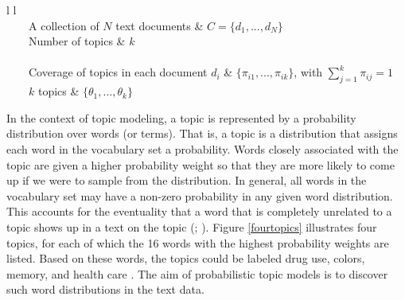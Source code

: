 \documentclass[11pt,a4paper,english,oneside]{book}
\newcommand{\tabitem}{~~\llap{\textbullet}~~}
\numberwithin{equation}{chapter}
\begin{document}
\begin{table}[h] %
	\centering %
	\begin{tabular}{ l  l  } %
		\toprule %
		 \\
		\midrule %
		\tabitem A collection of $N$  text documents & $C=\{d_1,...,d_N\}$ \\
		\tabitem Number of topics & $k$ \\
		\midrule
		 \\
		\midrule
		\tabitem Coverage of topics in each document $d_i$ & $\{\pi_{i1}, ..., \pi_{ik}\}$, with $\sum_{j=1}^{k} \pi_{ij} = 1$\\
		\tabitem $k$ topics & $\{\theta_1, ..., \theta_k\}$\\ %
		\bottomrule %
	\end{tabular}
	\caption{Formal definition of topic modeling task.} %
	\label{tab:task} %
\end{table}

In the context of topic modeling, a topic is represented by a probability distribution over words (or terms). That is, a topic is a distribution that assigns each word in the vocabulary set a probability. Words closely associated with the topic are given a higher probability weight so that they are more likely to come up if we were to sample from the distribution. In general, all words in the vocabulary set may have a non-zero probability in any given word distribution. This accounts for the eventuality that a word that is completely unrelated to a topic shows up in a text on the topic (\citealt[pp.~335--337]{Zhai.2016}; \citealt[p.~994]{Blei.2003}). Figure \ref{fourtopics} illustrates four topics, for each of which the 16 words with the highest probability weights are listed. Based on these words, the topics could be labeled drug use, colors, memory, and health care \cite[p.2]{Steyvers(2007)}. The aim of probabilistic topic models is to discover such word distributions in the text data. 
\end{document}

